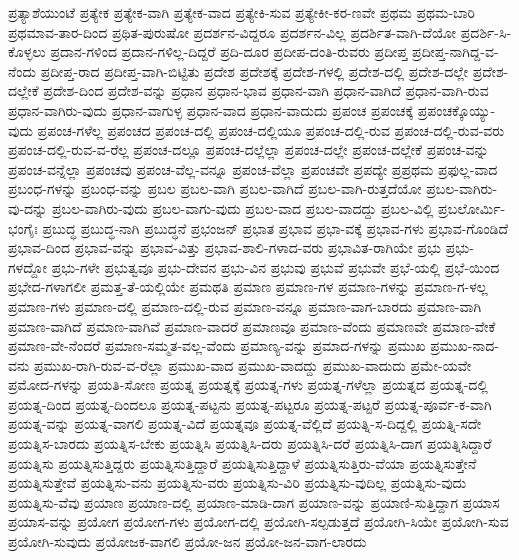 {ಪ್ರತ್ಯಾಶೆಯುಂಟೆ
ಪ್ರತ್ಯೇಕ
ಪ್ರತ್ಯೇಕ-ವಾಗಿ
ಪ್ರತ್ಯೇಕ-ವಾದ
ಪ್ರತ್ಯೇಕಿ-ಸುವ
ಪ್ರತ್ಯೇಕೀ-ಕರ-ಣವೇ
ಪ್ರಥಮ
ಪ್ರಥಮ-ಬಾರಿ
ಪ್ರಥಮಾವ-ತಾರ-ದಿಂದ
ಪ್ರಥಿತ-ಪುರುಷೋ
ಪ್ರದರ್ಶನ-ವಿದ್ದರೂ
ಪ್ರದರ್ಶನ-ವಿಲ್ಲ
ಪ್ರದರ್ಶಿತ-ವಾಗಿ-ದೆಯೋ
ಪ್ರದರ್ಶಿ-ಸಿ-ಕೊಳ್ಳಲು
ಪ್ರದಾನ-ಗಳಿಂದ
ಪ್ರದಾನ-ಗಳಿಲ್ಲ-ದಿದ್ದರೆ
ಪ್ರದಿ-ದೂರ
ಪ್ರದೀಪ-ದಂತಿ-ರುವರು
ಪ್ರದೀಪ್ತ
ಪ್ರದೀಪ್ತ-ನಾಗಿದ್ದ-ವ-ನೆಂದು
ಪ್ರದೀಪ್ತ-ರಾದ
ಪ್ರದೀಪ್ತ-ವಾಗಿ-ಬಿಟ್ಟಿತು
ಪ್ರದೇಶ
ಪ್ರದೇಶಕ್ಕೆ
ಪ್ರದೇಶ-ಗಳಲ್ಲಿ
ಪ್ರದೇಶ-ದಲ್ಲಿ
ಪ್ರದೇಶ-ದಲ್ಲೇ
ಪ್ರದೇಶ-ದಲ್ಲೇಕೆ
ಪ್ರದೇಶ-ದಿಂದ
ಪ್ರದೇಶ-ವನ್ನು
ಪ್ರಧಾನ
ಪ್ರಧಾನ-ಭಾವ
ಪ್ರಧಾನ-ವಾಗಿ
ಪ್ರಧಾನ-ವಾಗಿದೆ
ಪ್ರಧಾನ-ವಾಗಿ-ರುವ
ಪ್ರಧಾನ-ವಾಗಿರು-ವುದು
ಪ್ರಧಾನ-ವಾಗುಳ್ಳ
ಪ್ರಧಾನ-ವಾದ
ಪ್ರಧಾನ-ವಾದುದು
ಪ್ರಪಂಚ
ಪ್ರಪಂಚಕ್ಕೆ
ಪ್ರಪಂಚಕ್ಕೊಯ್ಯು-ವುದು
ಪ್ರಪಂಚ-ಗಳೆಲ್ಲ
ಪ್ರಪಂಚದ
ಪ್ರಪಂಚ-ದಲ್ಲಿ
ಪ್ರಪಂಚ-ದಲ್ಲಿಯೂ
ಪ್ರಪಂಚ-ದಲ್ಲಿ-ರುವ
ಪ್ರಪಂಚ-ದಲ್ಲಿ-ರುವ-ವರು
ಪ್ರಪಂಚ-ದಲ್ಲಿ-ರುವ-ವ-ರೆಲ್ಲ
ಪ್ರಪಂಚ-ದಲ್ಲೂ
ಪ್ರಪಂಚ-ದಲ್ಲೆಲ್ಲಾ
ಪ್ರಪಂಚ-ದಲ್ಲೇ
ಪ್ರಪಂಚ-ದಲ್ಲೇಕೆ
ಪ್ರಪಂಚ-ವನ್ನು
ಪ್ರಪಂಚ-ವನ್ನೆಲ್ಲಾ
ಪ್ರಪಂಚವು
ಪ್ರಪಂಚ-ವೆಲ್ಲ-ವನ್ನೂ
ಪ್ರಪಂಚ-ವೆಲ್ಲಾ
ಪ್ರಪಂಚವೇ
ಪ್ರಪದ್ಯೇ
ಪ್ರಪ್ರಥಮ
ಪ್ರಫುಲ್ಲ-ವಾದ
ಪ್ರಬಂಧ-ಗಳನ್ನು
ಪ್ರಬಂಧ-ವನ್ನು
ಪ್ರಬಲ
ಪ್ರಬಲ-ವಾಗಿ
ಪ್ರಬಲ-ವಾಗಿದೆ
ಪ್ರಬಲ-ವಾಗಿ-ರುತ್ತದೆಯೋ
ಪ್ರಬಲ-ವಾಗಿರು-ವು-ದನ್ನು
ಪ್ರಬಲ-ವಾಗಿರು-ವುದು
ಪ್ರಬಲ-ವಾಗು-ವುದು
ಪ್ರಬಲ-ವಾದ
ಪ್ರಬಲ-ವಾದದ್ದು
ಪ್ರಬಲ-ವಿಲ್ಲಿ
ಪ್ರಬಲೋರ್ಮಿ-ಭಂಗೈಃ
ಪ್ರಬುದ್ಧ
ಪ್ರಬುದ್ಧ-ನಾಗಿ
ಪ್ರಬುದ್ಧನೆ
ಪ್ರಭಂಜನ್
ಪ್ರಭಾತ
ಪ್ರಭಾವ
ಪ್ರಭಾ-ವಕ್ಕೆ
ಪ್ರಭಾವ-ಗಳು
ಪ್ರಭಾವ-ಗೊಂಡಿದೆ
ಪ್ರಭಾವ-ದಿಂದ
ಪ್ರಭಾವ-ವನ್ನು
ಪ್ರಭಾವ-ವಿತ್ತು
ಪ್ರಭಾವ-ಶಾಲಿ-ಗಳಾದ-ವರು
ಪ್ರಭಾವಿತ-ರಾಗಿಯೇ
ಪ್ರಭು
ಪ್ರಭು-ಗಳದ್ದೋ
ಪ್ರಭು-ಗಳೇ
ಪ್ರಭುತ್ವವೂ
ಪ್ರಭು-ದೇವನ
ಪ್ರಭು-ವಿನ
ಪ್ರಭುವು
ಪ್ರಭುವೆ
ಪ್ರಭುವೇ
ಪ್ರಭೆ-ಯಲ್ಲಿ
ಪ್ರಭೆ-ಯಿಂದ
ಪ್ರಭೇದ-ಗಳಾಗಲೀ
ಪ್ರಮತ್ತ-ತೆ-ಯಲ್ಲಿಯೇ
ಪ್ರಮಥತಿ
ಪ್ರಮಾಣ
ಪ್ರಮಾಣ-ಗಳ
ಪ್ರಮಾಣ-ಗಳನ್ನು
ಪ್ರಮಾಣ-ಗ-ಳಲ್ಲ
ಪ್ರಮಾಣ-ಗಳು
ಪ್ರಮಾಣ-ದಲ್ಲಿ
ಪ್ರಮಾಣ-ದಲ್ಲಿ-ರುವ
ಪ್ರಮಾಣ-ವನ್ನೂ
ಪ್ರಮಾಣ-ವಾಗ-ಬಾರದು
ಪ್ರಮಾಣ-ವಾಗಿ
ಪ್ರಮಾಣ-ವಾಗಿದೆ
ಪ್ರಮಾಣ-ವಾಗಿವೆ
ಪ್ರಮಾಣ-ವಾದರೆ
ಪ್ರಮಾಣವೂ
ಪ್ರಮಾಣ-ವೆಂದು
ಪ್ರಮಾಣವೇ
ಪ್ರಮಾಣ-ವೇಕೆ
ಪ್ರಮಾಣ-ವೇ-ನೆಂದರೆ
ಪ್ರಮಾಣ-ಸಮ್ಮತ-ವಲ್ಲ-ವೆಂದು
ಪ್ರಮಾಣ್ಯ-ವನ್ನು
ಪ್ರಮಾದ-ಗಳನ್ನು
ಪ್ರಮುಖ
ಪ್ರಮುಖ-ನಾದ-ವನು
ಪ್ರಮುಖ-ರಾಗಿ-ರುವ-ವ-ರೆಲ್ಲಾ
ಪ್ರಮುಖ-ವಾದ
ಪ್ರಮುಖ-ವಾದದ್ದು
ಪ್ರಮುಖ-ವಾದುದು
ಪ್ರಮೇ-ಯವೇ
ಪ್ರಮೋದ-ಗಳನ್ನು
ಪ್ರಯತಿ-ಸೋಣ
ಪ್ರಯತ್ನ
ಪ್ರಯತ್ನಕ್ಕೆ
ಪ್ರಯತ್ನ-ಗಳು
ಪ್ರಯತ್ನ-ಗಳೆಲ್ಲಾ
ಪ್ರಯತ್ನದ
ಪ್ರಯತ್ನ-ದಲ್ಲಿ
ಪ್ರಯತ್ನ-ದಿಂದ
ಪ್ರಯತ್ನ-ದಿಂದಲೂ
ಪ್ರಯತ್ನ-ಪಟ್ಟನು
ಪ್ರಯತ್ನ-ಪಟ್ಟರೂ
ಪ್ರಯತ್ನ-ಪಟ್ಟರೆ
ಪ್ರಯತ್ನ-ಪೂರ್ವ-ಕ-ವಾಗಿ
ಪ್ರಯತ್ನ-ವನ್ನು
ಪ್ರಯತ್ನ-ವಾಗಲಿ
ಪ್ರಯತ್ನ-ವಿದೆ
ಪ್ರಯತ್ನವೂ
ಪ್ರಯತ್ನ-ವೆಲ್ಲಿದೆ
ಪ್ರಯತ್ನಿ-ಸ-ದಿದ್ದಲ್ಲಿ
ಪ್ರಯತ್ನಿ-ಸದೇ
ಪ್ರಯತ್ನಿಸ-ಬಾರದು
ಪ್ರಯತ್ನಿಸ-ಬೇಕು
ಪ್ರಯತ್ನಿಸಿ
ಪ್ರಯತ್ನಿಸಿ-ದರು
ಪ್ರಯತ್ನಿಸಿ-ದರೆ
ಪ್ರಯತ್ನಿಸಿ-ದಾಗ
ಪ್ರಯತ್ನಿಸಿದ್ದಾರೆ
ಪ್ರಯತ್ನಿಸು
ಪ್ರಯತ್ನಿಸುತ್ತಿದ್ದರು
ಪ್ರಯತ್ನಿಸುತ್ತಿದ್ದಾರೆ
ಪ್ರಯತ್ನಿಸುತ್ತಿದ್ದಾಳೆ
ಪ್ರಯತ್ನಿಸುತ್ತಿರು-ವೆಯಾ
ಪ್ರಯತ್ನಿಸುತ್ತೇನೆ
ಪ್ರಯತ್ನಿಸುತ್ತೇವೆ
ಪ್ರಯತ್ನಿಸು-ವನು
ಪ್ರಯತ್ನಿಸು-ವರು
ಪ್ರಯತ್ನಿಸು-ವಿರಿ
ಪ್ರಯತ್ನಿಸು-ವುದಿಲ್ಲ
ಪ್ರಯತ್ನಿಸು-ವುದು
ಪ್ರಯತ್ನಿಸು-ವೆವು
ಪ್ರಯಾಣ
ಪ್ರಯಾಣ-ದಲ್ಲಿ
ಪ್ರಯಾಣ-ಮಾಡಿ-ದಾಗ
ಪ್ರಯಾಣ-ವನ್ನು
ಪ್ರಯಾಣಿ-ಸುತ್ತಿದ್ದಾಗ
ಪ್ರಯಾಸ
ಪ್ರಯಾಸ-ವನ್ನು
ಪ್ರಯೋಗ
ಪ್ರಯೋಗ-ಗಳು
ಪ್ರಯೋಗ-ದಲ್ಲಿ
ಪ್ರಯೋಗಿ-ಸಲ್ಪಡುತ್ತದೆ
ಪ್ರಯೋಗಿ-ಸಿಯೇ
ಪ್ರಯೋಗಿ-ಸುವ
ಪ್ರಯೋಗಿ-ಸುವುದು
ಪ್ರಯೋಜಕ-ವಾಗಲಿ
ಪ್ರಯೋ-ಜನ
ಪ್ರಯೋ-ಜನ-ವಾಗ-ಲಾರದು
}
